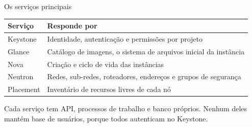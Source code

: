 \documentclass[aspectratio=169]{beamer}
\begin{document}
\begin{frame}{Os serviços principais}
  \footnotesize
  \begin{tabularx}{\textwidth}{@{} l X @{}}
    \toprule
    \textbf{Serviço} & \textbf{Responde por} \\
    \midrule
    Keystone  & Identidade, autenticação e permissões por projeto \\
    Glance    & Catálogo de imagens, o sistema de arquivos inicial da instância \\
    Nova      & Criação e ciclo de vida das instâncias \\
    Neutron   & Redes, sub-redes, roteadores, endereços e grupos de segurança \\
    Placement & Inventário de recursos livres de cada nó \\
    \bottomrule
  \end{tabularx}
  \vspace{0.4cm}
  \normalsize
  \begin{tcolorbox}[colback=structure.fg!10, colframe=structure.fg!60, arc=2mm]
    Cada serviço tem API, processos de trabalho e banco próprios. Nenhum deles mantém base de usuários, porque todos autenticam no Keystone.
  \end{tcolorbox}
\end{frame}
\end{document}
